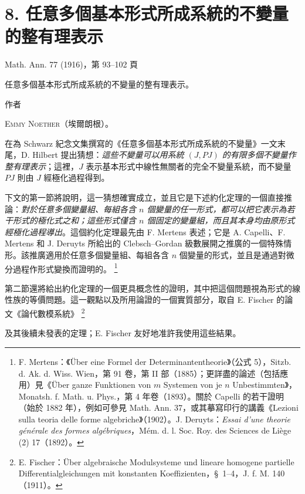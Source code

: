 \documentclass[11pt]{article}
\providecommand{\NoetherSrcNote}[2]{%
  \begingroup\renewcommand{\thefootnote}{#1}\footnote{#2}\addtocounter{footnote}{-1}\endgroup}
\begin{document}
\setcounter{footnote}{0}
\section*{8. 任意多個基本形式所成系統的不變量的整有理表示}
\begin{center}
Math. Ann. 77 (1916)，第 93--102 頁
\end{center}

\begin{center}
{\Large 任意多個基本形式所成系統的不變量的整有理表示。}\par
\vspace{1.2em}
作者\par
\vspace{0.8em}
{\scshape Emmy Noether}（埃爾朗根）。
\end{center}

在為 Schwarz 紀念文集撰寫的《任意多個基本形式所成系統的不變量》一文末尾，D. Hilbert 提出猜想：\emph{這些不變量可以用系統 $(J,PJ)$ 的有限多個不變量作整有理表示}；這裡，$J$ 表示基本形式中線性無關者的完全不變量系統，而不變量 $PJ$ 則由 $J$ 經極化過程得到。

下文的第一節將說明，這一猜想確實成立，並且它是下述約化定理的一個直接推論：\emph{對於任意多個變量組、每組各含 $n$ 個變量的任一形式，都可以把它表示為若干形式的極化式之和；這些形式僅含 $n$ 個固定的變量組，而且其本身均由原形式經極化過程導出}。這個約化定理最先由 F. Mertens 表述；它是 A. Capelli、F. Mertens 和 J. Deruyts 所給出的 Clebsch--Gordan 級數展開之推廣的一個特殊情形。該推廣適用於任意多個變量組、每組各含 $n$ 個變量的形式，並且是通過對微分過程作形式變換而證明的。\NoetherSrcNote{*)}{F. Mertens：《Über eine Formel der Determinantentheorie》（公式 5），Sitzb. d. Ak. d. Wiss. Wien，第 91 卷，第 II 部（1885）；更詳盡的論述（包括應用）見《Über ganze Funktionen von $m$ Systemen von je $n$ Unbestimmten》，Monatsh. f. Math. u. Phys.，第 4 年卷（1893）。關於 Capelli 的若干證明（始於 1882 年），例如可參見 Math. Ann. 37，或其摹寫印行的講義《Lezioni sulla teoria delle forme algebriche》（1902）。J. Deruyts：\emph{Essai d'une theorie générale des formes algébriques}，Mém. d. l. Soc. Roy. des Sciences de Liège (2) 17（1892）。}

第二節還將給出約化定理的一個更具概念性的證明，其中把這個問題視為形式的線性族的等價問題。這一觀點以及所用論證的一個實質部分，取自 E. Fischer 的論文《論代數模系統》\NoetherSrcNote{*)}{E. Fischer：Über algebraische Modulsysteme und lineare homogene partielle Differentialgleichungen mit konstanten Koeffizienten，\S\ 1--4，J. f. M. 140（1911）。}及其後續未發表的定理；E. Fischer 友好地准許我使用這些結果。
\end{document}
